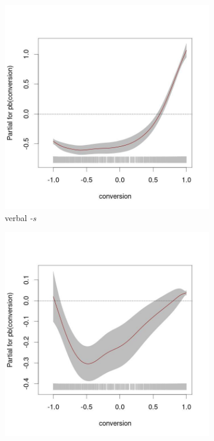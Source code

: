 \documentclass[
]{article}
\begin{document}
\begin{figure}[t!]
     \centering
     \begin{subfigure}[b]{0.49\textwidth}
         \centering
         \includegraphics[width=\textwidth]{figures/m_verb_mu_conversion.jpg}
         \caption{verbal \textit{-s}}
         \label{verb_mu_conv}
     \end{subfigure}
     \hfill
     \begin{subfigure}[b]{0.49\textwidth}
         \centering
         \includegraphics[width=\textwidth]{figures/m_noun_mu_conversion.jpg}

\end{subfigure}
\end{figure}
\end{document}
